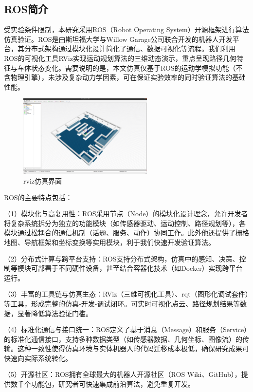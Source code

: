 \documentclass[master,academic]{ysuthesis} %
\begin{document}
	\subsection{ROS简介}
	受实验条件限制，本研究采用ROS（Robot Operating System）开源框架进行算法仿真验证。ROS是由斯坦福大学与Willow Garage公司联合开发的机器人开发平台，其分布式架构通过模块化设计简化了通信、数据可视化等流程。我们利用ROS的可视化工具RViz实现运动规划算法的三维动态演示，重点呈现路径几何特征与车体状态变化。需要说明的是，本文仿真仅基于ROS的运动学模拟功能（不含物理引擎），未涉及复杂动力学因素，可在保证实验效率的同时验证算法的基础性能。
	\begin{figure}[!ht]
		\centering
		\includegraphics[width=0.6\textwidth]{rviz_view.png}
		\caption{rviz仿真界面}
		\label{fig:rviz仿真界面}
	\end{figure}

	ROS的主要特点包括：

	（1）模块化与高复用性：ROS采用节点（Node）的模块化设计理念，允许开发者将复杂系统拆分为独立的功能模块（如传感器驱动、运动控制、路径规划等），各模块通过松耦合的通信机制（话题、服务、动作）协同工作。此外他还提供了栅格地图、导航框架和坐标变换等实用模块，利于我们快速开发验证算法。

	（2）分布式计算与跨平台支持：ROS支持分布式架构，仿真中的感知、决策、控制等模块可部署于不同硬件设备，甚至结合容器化技术（如Docker）实现跨平台运行。

	（3）丰富的工具链与仿真生态​：RViz（三维可视化工具）、rqt（图形化调试套件）等工具，形成完整的仿真-开发-调试闭环。可实时可视化点云、路径规划结果等数据，显著降低算法验证门槛。

	（4）标准化通信与接口统一：ROS定义了基于消息（Message）和服务（Service）的标准化通信接口，支持多种数据类型（如传感器数据、几何坐标、图像流）的传输。这种一致性使得仿真环境与实体机器人的代码迁移成本极低，确保研究成果可快速向实际系统转化。

	（5）开源社区：ROS拥有全球最大的机器人开源社区（ROS Wiki、GitHub），提供数千个功能包，研究者可快速集成前沿算法，避免重复开发。
\end{document}
